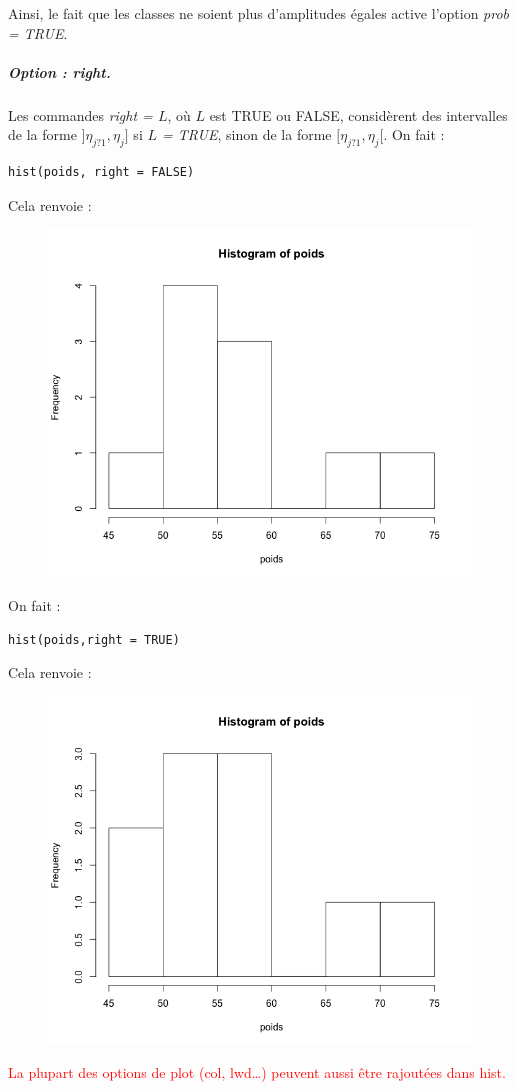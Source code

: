 Ainsi, le fait que les classes ne soient plus d'amplitudes égales active l'option \textit{prob = TRUE}.
\subparagraph{Option : right. } 
Les commandes \textit{right = $L$}, où $L$ est TRUE ou FALSE, considèrent des intervalles de la forme $]\eta_{j?1},\eta_{j}]$ si \textit{$L$ = TRUE}, sinon de la forme $[\eta_{j?1},\eta_j[$.\newline
On fait :
\begin{lstlisting}[language=html]
hist(poids, right = FALSE)
\end{lstlisting}
Cela renvoie :
\begin{figure}[H]\begin{center}\includegraphics[scale=0.4]{ilu/gra48.png}\end{center}\end{figure}
On fait :
\begin{lstlisting}[language=html]
hist(poids,right = TRUE)
\end{lstlisting}
Cela renvoie :
\begin{figure}[H]\begin{center}\includegraphics[scale=0.4]{ilu/gra49.png}\end{center}\end{figure}
\textcolor{red}{La plupart des options de plot (col, lwd\dots) peuvent aussi être rajoutées dans hist.}
